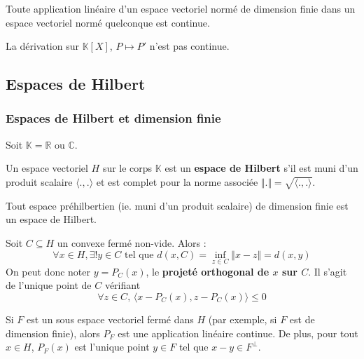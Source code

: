 	\begin{proposition}
		Toute application linéaire d'un espace vectoriel normé de dimension finie dans un espace vectoriel normé quelconque est continue.
	\end{proposition}

	\begin{cexample}
		La dérivation sur $\mathbb{K}[X]$, $P \mapsto P'$ n'est pas continue.
	\end{cexample}

	\subsection{Espaces de Hilbert}

	\subsubsection{Espaces de Hilbert et dimension finie}


	Soit $\mathbb{K} = \mathbb{R}$ ou $\mathbb{C}$.

	\begin{definition}
		Un espace vectoriel $H$ sur le corps $\mathbb{K}$ est un \textbf{espace de Hilbert} s'il est muni d'un produit scalaire $\langle . , . \rangle$ et est complet pour la norme associée $\Vert . \Vert = \sqrt{\langle . , . \rangle}$.
	\end{definition}

	\begin{example}
		Tout espace préhilbertien (ie. muni d'un produit scalaire) de dimension finie est un espace de Hilbert.
	\end{example}

	\begin{theorem}
		Soit $C \subseteq H$ un convexe fermé non-vide. Alors :
		\[ \forall x \in H, \exists! y \in C \text{ tel que } d(x, C) = \inf_{z \in C} \Vert x - z \Vert = d(x, y) \]
		On peut donc noter $y = P_C(x)$, le \textbf{projeté orthogonal de $x$ sur $C$}. Il s'agit de l'unique point de $C$ vérifiant
		\[ \forall z \in C, \, \langle x - P_C(x), z - P_C(x) \rangle \leq 0 \]
	\end{theorem}

	\begin{theorem}
		Si $F$ est un sous espace vectoriel fermé dans $H$ (par exemple, si $F$ est de dimension finie), alors $P_F$ est une application linéaire continue. De plus, pour tout $x \in H$, $P_F(x)$ est l'unique point $y \in F$ tel que $x-y \in F^\perp$.
	\end{theorem}

